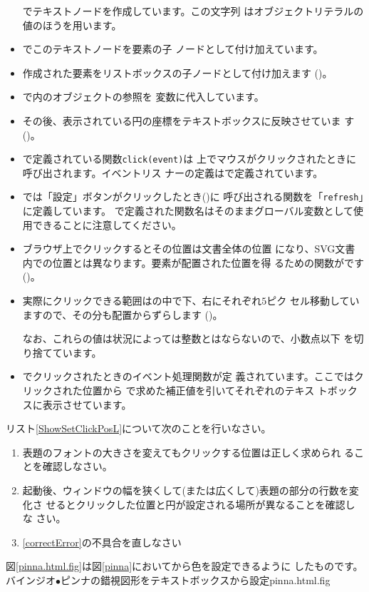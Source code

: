\begin{itemize}
       でテキストノードを作成しています。この文字列
       はオブジェクトリテラルの値のほうを用います。
 \item {}でこのテキストノードを要素の子
       ノードとして付け加えています。
 \item 作成された要素をリストボックスの子ノードとして付け加えます
       ()。
 \item {}で\HTML 内のオブジェクトの参照を
       変数に代入しています。
 \item その後、表示されている円の座標をテキストボックスに反映させていま
       す()。
  \item {}で定義されている関数\texttt{click(event)}は
       \SVG 上でマウスがクリックされたときに呼び出されます。イベントリス
       ナーの定義はで定義されています。
 \item {}では「設定」ボタンがクリックしたとき()に
       呼び出される関数を「\texttt{refresh}」に定義しています。
       で定義された関数名はそのままグローバル変数として使
       用できることに注意してください。
 \item ブラウザ上でクリックするとその位置は文書全体の位置
       になり、SVG文書内での位置とは異なります。要素が配置された位置を得
       るための関数がです()。
 \item 実際にクリックできる範囲はの中で下、右にそれぞれ$5$ピク
			 セル移動していますので、その分も配置からずらします
			 ()。

			 なお、これらの値は状況によっては整数とはならないので、小数点以下
			 を切り捨てています。
 \item {}でクリックされたときのイベント処理関数が定
       義されています。ここではクリックされた位置から
       で求めた補正値を引いてそれぞれのテキス
       トボックスに表示させています。
\end{itemize}
\begin{Problem}\upshape
 リスト\ref{ShowSetClickPosL}について次のことを行いなさい。
\begin{enumerate}
 \item 表題のフォントの大きさを変えてもクリックする位置は正しく求められ
       ることを確認しなさい。
 \item 起動後、ウィンドウの幅を狭くして(または広くして)表題の部分の行数を変化さ
       せるとクリックした位置と円が設定される場所が異なることを確認しな
       さい。\label{correctError}
 \item \ref{correctError}の不具合を直しなさい
\end{enumerate}
\end{Problem}
図\ref{pinna.html.fig}は図\ref{pinna}において\HTML から色を設定できるように
したものです。
{バインジオ$\bullet$ピンナの錯視図形をテキストボックスから設定}{pinna.html.fig}

